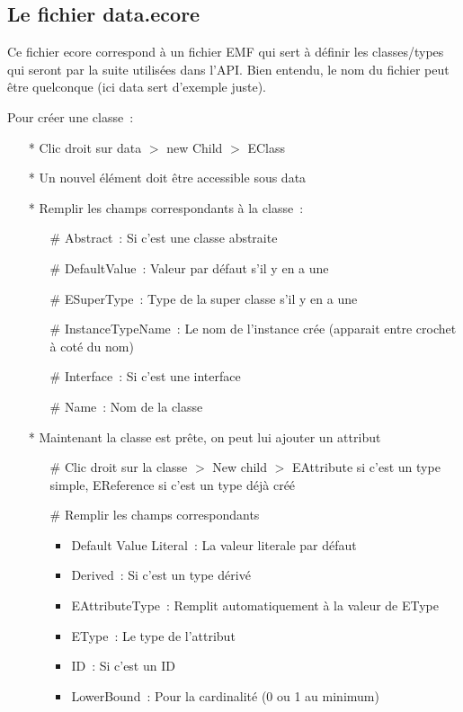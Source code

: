 \documentclass{article}
\begin{document}
\subsection*{Le fichier data.ecore}
Ce fichier ecore correspond \`a un fichier EMF qui sert \`a d\'efinir les classes/types qui seront par la suite utilis\'ees dans l'API. Bien entendu, le nom du fichier peut \^etre quelconque (ici data sert d'exemple juste).

Pour cr\'eer une classe~:
\begin{itemize}
\item[*] Clic droit sur data $>$ new Child $>$ EClass
\item[*] Un nouvel \'el\'ement doit \^etre accessible sous data
\item[*] Remplir les champs correspondants \`a la classe~:
  \begin{itemize}
  \item[\#] Abstract~: Si c'est une classe abstraite
  \item[\#] DefaultValue~: Valeur par d\'efaut s'il y en a une
  \item[\#] ESuperType~: Type de la super classe s'il y en a une
  \item[\#] InstanceTypeName~: Le nom de l'instance cr\'ee (apparait entre crochet \`a cot\'e du nom)
  \item[\#] Interface~: Si c'est une interface
  \item[\#] Name~: Nom de la classe
  \end{itemize}
\item[*] Maintenant la classe est pr\^ete, on peut lui ajouter un attribut
  \begin{itemize}
  \item[\#] Clic droit sur la classe $>$ New child $>$ EAttribute si c'est un type simple, EReference si c'est un type d\'ej\`a cr\'e\'e
  \item[\#] Remplir les champs correspondants
    \begin{itemize}
    \item Default Value Literal~: La valeur literale par d\'efaut
    \item Derived~: Si c'est un type d\'eriv\'e
    \item EAttributeType~: Remplit automatiquement \`a la valeur de EType
    \item EType~: Le type de l'attribut
    \item ID~: Si c'est un ID
    \item LowerBound~: Pour la cardinalit\'e (0 ou 1 au minimum)

\end{itemize}
\end{itemize}
\end{itemize}
\end{document}
